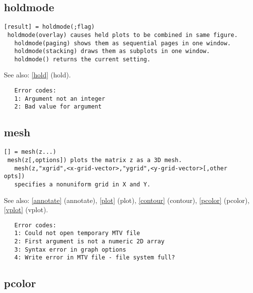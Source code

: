 \documentclass[a4paper]{article}
\begin{document}
\subsection{holdmode\label{holdmode}}

\begin{tscreen}
\begin{verbatim}
[result] = holdmode(;flag)
 holdmode(overlay) causes held plots to be combined in same figure.
   holdmode(paging) shows them as sequential pages in one window.
   holdmode(stacking) draws them as subplots in one window.
   holdmode() returns the current setting.
\end{verbatim}

See also: \ref{hold} {(hold)}.
\begin{verbatim}
   Error codes:
   1: Argument not an integer
   2: Bad value for argument 
\end{verbatim}
\end{tscreen}



\subsection{mesh\label{mesh}}

\begin{tscreen}
\begin{verbatim}
[] = mesh(z...)
 mesh(z[,options]) plots the matrix z as a 3D mesh.
   mesh(z,"xgrid",<x-grid-vector>,"ygrid",<y-grid-vector>[,other opts])
   specifies a nonuniform grid in X and Y.
\end{verbatim}

See also: \ref{annotate} {(annotate)}, \ref{plot} {(plot)}, \ref{contour} {(contour)}, \ref{pcolor} {(pcolor)}, \ref{vplot} {(vplot)}.
\begin{verbatim}
   Error codes:
   1: Could not open temporary MTV file
   2: First argument is not a numeric 2D array
   3: Syntax error in graph options
   4: Write error in MTV file - file system full? 
\end{verbatim}
\end{tscreen}



\subsection{pcolor\label{pcolor}}
\end{document}
